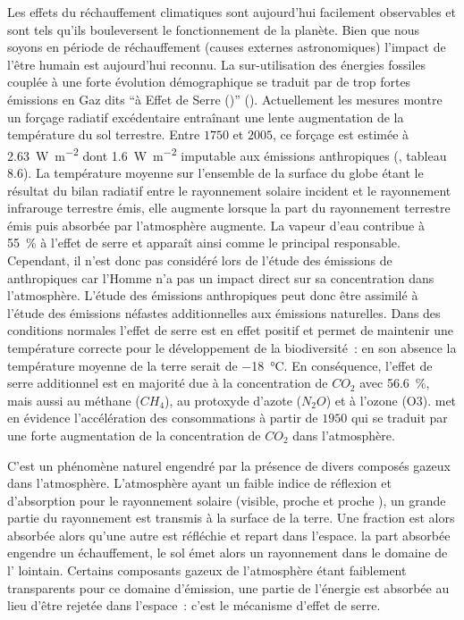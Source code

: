 Les effets du réchauffement climatiques sont aujourd’hui facilement observables et sont
tels qu’ils bouleversent le fonctionnement de la planète. Bien que nous soyons en période
de réchauffement (causes externes astronomiques) l’impact de l’être humain est aujourd’hui
reconnu. La sur-utilisation des énergies fossiles couplée à une forte évolution
démographique se traduit par de trop fortes émissions en Gaz dits \enquote{à Effet de
Serre ()} (). Actuellement les mesures montre un forçage
radiatif excédentaire entraînant une lente augmentation de la température du sol
terrestre. Entre $1750$ et $2005$, ce forçage est estimée à
\SI{2.63}{\watt\per\metre\squared} dont \SI{1.6}{\watt\per\metre\squared} imputable aux
émissions anthropiques (\cite{Myhre2013}, tableau 8.6). La température moyenne sur
l’ensemble de la surface du globe étant le résultat du bilan radiatif entre le rayonnement
solaire incident et le rayonnement infrarouge terrestre émis, elle augmente lorsque la
part du rayonnement terrestre émis puis absorbée par l’atmosphère augmente. La vapeur
d’eau contribue à \SI{55}{\percent} à l’effet de serre et apparaît ainsi comme le
principal responsable. Cependant, il n’est donc pas considéré lors de
l’étude des émissions de
 anthropiques car l’Homme n’a pas un impact direct sur sa concentration dans l’atmosphère.
L’étude des émissions anthropiques peut donc être assimilé à l’étude des émissions
néfastes additionnelles aux émissions naturelles. Dans des conditions normales l’effet de
serre est en effet positif et permet de maintenir une température correcte pour le
développement de la biodiversité~: en son absence la température moyenne de la terre
serait de \SI{-18}{\celsius}. En conséquence, l’effet de serre additionnel est en majorité
due à la concentration de $CO_{2}$ avec \SI{56.6}{\percent}, mais aussi au méthane
($CH_{4}$), au protoxyde d’azote ($N_{2}O$) et à l’ozone (O3).
 met en évidence l’accélération
des consommations à partir de $1950$ qui se traduit par une forte
augmentation de la concentration de $CO_{2}$ dans l’atmosphère.

\begin{Def}\label{def:effet_serre}
C’est un phénomène naturel engendré par la présence de divers composés
gazeux dans l’atmosphère. L’atmosphère ayant un faible indice de réflexion et d’absorption
pour le rayonnement solaire (visible, proche  et proche ), un grande
partie du rayonnement est transmis à la surface de la terre. Une fraction est alors
absorbée alors qu’une autre est réfléchie et repart dans l’espace. la part absorbée
engendre un échauffement, le sol émet alors un rayonnement dans le domaine de l’
lointain. Certains composants gazeux de l’atmosphère étant faiblement transparents pour ce
domaine d’émission, une partie de l’énergie est absorbée au lieu d’être rejetée dans
l’espace~: c’est le mécanisme d’effet de serre.
\end{Def}

